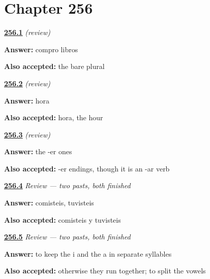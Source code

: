 \section*{Chapter 256}

\noindent\begin{minipage}[t]{\linewidth}
\raggedright
\hyperlink{review-ES-C65-repaso-parejas-bare}{\textbf{256.1}} \emph{(review)}\par
\small \textbf{Answer:} compro libros\par
\footnotesize \textbf{Also accepted:} the bare plural
\end{minipage}\par\medskip

\noindent\begin{minipage}[t]{\linewidth}
\raggedright
\hyperlink{review-ES-C65-repaso-parejas-hora}{\textbf{256.2}} \emph{(review)}\par
\small \textbf{Answer:} hora\par
\footnotesize \textbf{Also accepted:} hora, the hour
\end{minipage}\par\medskip

\noindent\begin{minipage}[t]{\linewidth}
\raggedright
\hyperlink{review-ES-C65-repaso-parejas-dar}{\textbf{256.3}} \emph{(review)}\par
\small \textbf{Answer:} the -er ones\par
\footnotesize \textbf{Also accepted:} -er endings, though it is an -ar verb
\end{minipage}\par\medskip

\noindent\begin{minipage}[t]{\linewidth}
\raggedright
\hyperlink{review-ES-C65-repaso-dos-pasados-isteis}{\textbf{256.4}} \emph{Review — two pasts, both finished}\par
\small \textbf{Answer:} comisteis, tuvisteis\par
\footnotesize \textbf{Also accepted:} comisteis y tuvisteis
\end{minipage}\par\medskip

\noindent\begin{minipage}[t]{\linewidth}
\raggedright
\hyperlink{review-ES-C65-repaso-dos-pasados-acento}{\textbf{256.5}} \emph{Review — two pasts, both finished}\par
\small \textbf{Answer:} to keep the i and the a in separate syllables\par
\footnotesize \textbf{Also accepted:} otherwise they run together; to split the vowels
\end{minipage}\par\medskip

